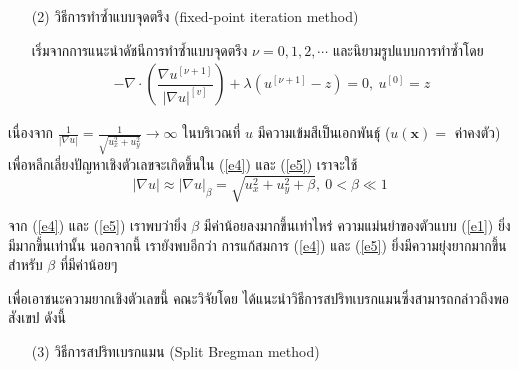 \documentclass[hidelinks,a4paper]{article}
\numberwithin{equation}{section}							%
\begin{document}
{\begin{itemize}
	\item [(2)] วิธีการทำซ้ำแบบจุดตรึง (fixed-point iteration method)
	 
	เริ่มจากการแนะนำดัชนีการทำซ้ำแบบจุดตรึง $\nu=0,1,2,\cdots$ และนิยามรูปแบบการทำซ้ำโดย
	\begin{align}
	- \nabla\cdot\left(\dfrac{\nabla u^{[\nu+1]}}{{| \nabla u |}^{[v]} }\right) + \lambda(u^{[\nu+1]}-z)  = 0,\ u^{[0]}=z
	\label{e5}
	\end{align}
\end{itemize}

\hspace{1cm} เนื่องจาก $\tfrac{1}{| \nabla u |}=\tfrac{1}{\sqrt{u_x^2+u_y^2}} \rightarrow \infty$ ในบริเวณที่ $u$ มีความเข้มสีเป็นเอกพันธ์ุ ($u(\mathbf{x})=$ ค่าคงตัว) เพื่อหลีกเลี่ยงปัญหาเชิงตัวเลขจะเกิดขึ้นใน (\ref{e4}) และ (\ref{e5}) เราจะใช้ 
\[
|\nabla u| \approx| \nabla u |_\beta=\sqrt{u_x^2+u_y^2+\beta},\ 0< \beta \ll 1
\] 

\hspace{1cm} จาก (\ref{e4}) และ (\ref{e5}) เราพบว่ายิ่ง $\beta$ มีค่าน้อยลงมากขึ้นเท่าไหร่ ความแม่นยำของตัวแบบ (\ref{e1}) ยิ่งมีมากขึ้นเท่านั้น นอกจากนี้ เรายังพบอีกว่า การแก้สมการ (\ref{e4}) และ (\ref{e5}) ยิ่งมีความยุ่งยากมากขึ้นสำหรับ $\beta$ ที่มีค่าน้อยๆ 

\hspace{1cm} เพื่อเอาชนะความยากเชิงตัวเลขนี้ คณะวิจัยโดย \cite{ref:splitbergman-inpaint} ได้แนะนำวิธีการสปริทเบรกแมนซึ่งสามารถกล่าวถึงพอสังเขป ดังนี้

\begin{itemize}
	\item [(3)] วิธีการสปริทเบรกแมน (Split Bregman method)
	

\end{itemize}}
\end{document}
